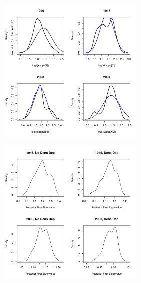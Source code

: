 \documentclass[mathserif,compress]{beamer}
\begin{document}
\begin{frame} 

\begin{center}
	\includegraphics[height=7cm]{figure/Post_kappa} 
\end{center}
\end{frame}


\begin{frame} 

\begin{center}
	\includegraphics[height=7cm]{figure/Post_eigval} 
\end{center}
\end{frame}

\end{document}
